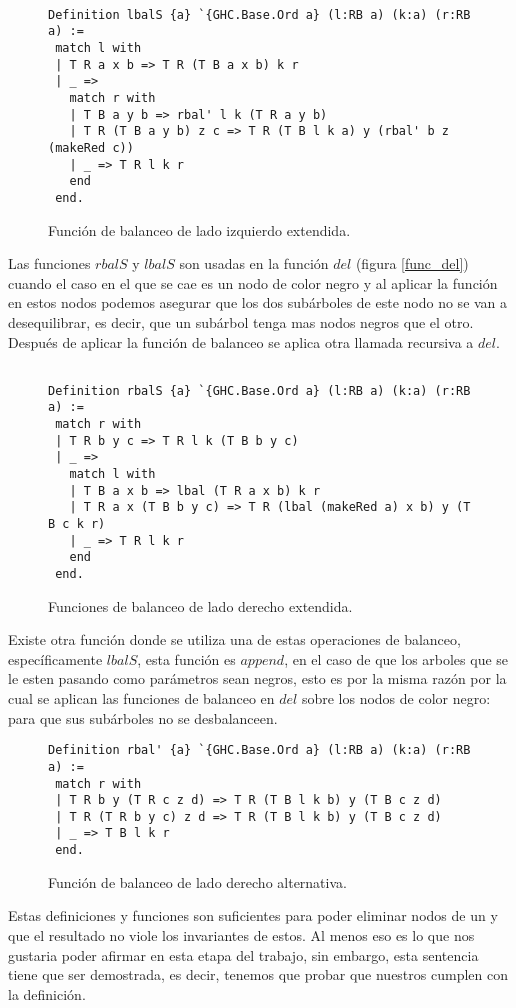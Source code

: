 \begin{figure}
\centering
\captionsetup{justification=centering}
\begin{verbatim}

Definition lbalS {a} `{GHC.Base.Ord a} (l:RB a) (k:a) (r:RB a) :=
 match l with
 | T R a x b => T R (T B a x b) k r
 | _ =>
   match r with
   | T B a y b => rbal' l k (T R a y b)
   | T R (T B a y b) z c => T R (T B l k a) y (rbal' b z (makeRed c))
   | _ => T R l k r
   end
 end.

\end{verbatim}
\caption{Funci\'on de balanceo de lado izquierdo extendida.}
\label{lbalS}
\end{figure}

Las funciones $rbalS$ y $lbalS$ son usadas en la funci\'on $del$ (figura \ref{func_del}) cuando el
caso en el que se cae es un nodo de color negro y al aplicar la funci\'on en estos nodos podemos
asegurar que los dos subárboles de este nodo no se van a desequilibrar, es decir, que un subárbol
tenga mas nodos negros que el otro. Después de aplicar la función de balanceo se aplica otra llamada
recursiva a $del$.


\begin{figure}
\centering
\captionsetup{justification=centering}
\begin{verbatim}

Definition rbalS {a} `{GHC.Base.Ord a} (l:RB a) (k:a) (r:RB a) :=
 match r with
 | T R b y c => T R l k (T B b y c)
 | _ =>
   match l with
   | T B a x b => lbal (T R a x b) k r
   | T R a x (T B b y c) => T R (lbal (makeRed a) x b) y (T B c k r)
   | _ => T R l k r
   end
 end.

\end{verbatim}
\caption{Funciones de balanceo de lado derecho extendida.}
\label{rbalS}
\end{figure}

Existe otra función donde se utiliza una de estas operaciones de balanceo, específicamente $lbalS$,
esta funci\'on es $append$, en el caso de que los arboles que se le esten pasando como parámetros
sean negros, esto es por la misma razón por la cual se aplican las funciones de balanceo en $del$
sobre los nodos de color negro: para que sus subárboles no se desbalanceen.

\begin{figure}
\centering
\captionsetup{justification=centering}
\begin{verbatim}
Definition rbal' {a} `{GHC.Base.Ord a} (l:RB a) (k:a) (r:RB a) :=
 match r with
 | T R b y (T R c z d) => T R (T B l k b) y (T B c z d)
 | T R (T R b y c) z d => T R (T B l k b) y (T B c z d)
 | _ => T B l k r
 end.

\end{verbatim}
\caption{Funci\'on de balanceo de lado derecho alternativa.}
\label{rbal_2}
\end{figure}

Estas definiciones y funciones son suficientes para poder eliminar nodos de un {\arn} y que el
resultado no viole los invariantes de estos. Al menos eso es lo que nos gustaria poder afirmar en
esta etapa del trabajo, sin embargo, esta sentencia tiene que ser demostrada, es decir, tenemos que
probar que nuestros {\arns} cumplen con la definición.
